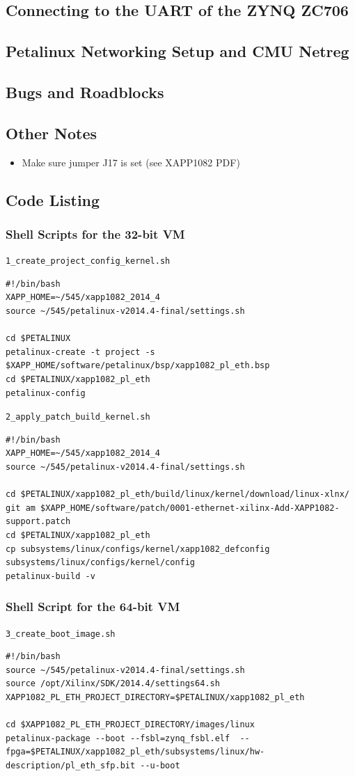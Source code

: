 \documentclass[12pt]{report}
\begin{document}
\subsection{Connecting to the UART of the ZYNQ ZC706}
\subsection{Petalinux Networking Setup and CMU Netreg}
\subsection{Bugs and Roadblocks}
\subsection{Other Notes}
\begin{itemize}
\item Make sure jumper J17 is set (see XAPP1082 PDF)
\end{itemize}
\subsection{Code Listing}
\subsubsection{Shell Scripts for the 32-bit VM}
\texttt{1\_create\_project\_config\_kernel.sh}
\begin{lstlisting}
#!/bin/bash
XAPP_HOME=~/545/xapp1082_2014_4
source ~/545/petalinux-v2014.4-final/settings.sh

cd $PETALINUX
petalinux-create -t project -s $XAPP_HOME/software/petalinux/bsp/xapp1082_pl_eth.bsp
cd $PETALINUX/xapp1082_pl_eth
petalinux-config
\end{lstlisting}
\texttt{2\_apply\_patch\_build\_kernel.sh}
\begin{lstlisting}
#!/bin/bash
XAPP_HOME=~/545/xapp1082_2014_4
source ~/545/petalinux-v2014.4-final/settings.sh

cd $PETALINUX/xapp1082_pl_eth/build/linux/kernel/download/linux-xlnx/
git am $XAPP_HOME/software/patch/0001-ethernet-xilinx-Add-XAPP1082-support.patch
cd $PETALINUX/xapp1082_pl_eth
cp subsystems/linux/configs/kernel/xapp1082_defconfig subsystems/linux/configs/kernel/config
petalinux-build -v
\end{lstlisting}

\subsubsection{Shell Script for the 64-bit VM}
\texttt{3\_create\_boot\_image.sh}
\begin{lstlisting}
#!/bin/bash
source ~/545/petalinux-v2014.4-final/settings.sh
source /opt/Xilinx/SDK/2014.4/settings64.sh
XAPP1082_PL_ETH_PROJECT_DIRECTORY=$PETALINUX/xapp1082_pl_eth

cd $XAPP1082_PL_ETH_PROJECT_DIRECTORY/images/linux
petalinux-package --boot --fsbl=zynq_fsbl.elf  --fpga=$PETALINUX/xapp1082_pl_eth/subsystems/linux/hw-description/pl_eth_sfp.bit --u-boot
\end{lstlisting}
\end{document}
